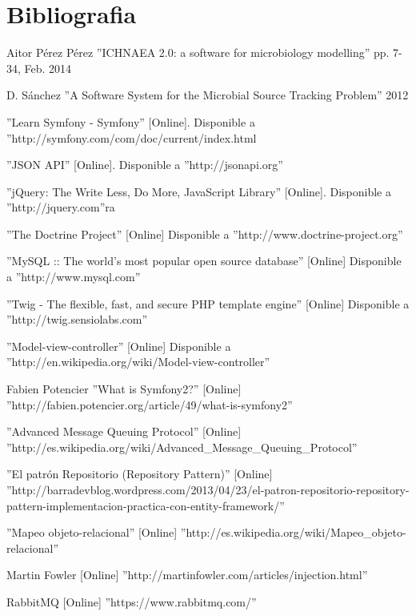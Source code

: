 \chapter{Bibliografia}
\label{cha:bibliografia}
\begin{thebibliography}{100}
Aitor P\'{e}rez P\'{e}rez ''ICHNAEA 2.0: a software for microbiology modelling'' pp. 7-34, Feb. 2014

D. S\'{a}nchez ''A Software System for the Microbial Source Tracking Problem'' 2012

 ''Learn Symfony - Symfony'' [Online]. Disponible a ''http://symfony.com/com/doc/current/index.html

 ''JSON API''  [Online]. Disponible a ''http://jsonapi.org''

 ''jQuery: The Write Less, Do More, JavaScript Library'' [Online]. Disponible a ''http://jquery.com''ra

 ''The Doctrine Project'' [Online] Disponible a ''http://www.doctrine-project.org''

 ''MySQL :: The world's most popular open source database'' [Online] Disponible a ''http://www.mysql.com''

 ''Twig - The flexible, fast, and secure PHP template engine''  [Online] Disponible a ''http://twig.sensiolabs.com''

 ''Model-view-controller'' [Online] Disponible a ''http://en.wikipedia.org/wiki/Model-view-controller''

 Fabien Potencier ''What is Symfony2?'' [Online] ''http://fabien.potencier.org/article/49/what-is-symfony2''

 ''Advanced Message Queuing Protocol'' [Online] ''http://es.wikipedia.org/wiki/Advanced\_Message\_Queuing\_Protocol''

 ''El patr\'{o}n Repositorio (Repository Pattern)'' [Online] ''http://barradevblog.wordpress.com/2013/04/23/el-patron-repositorio-repository-pattern-implementacion-practica-con-entity-framework/''

 ''Mapeo objeto-relacional'' [Online] ''http://es.wikipedia.org/wiki/Mapeo_objeto-relacional''

 Martin Fowler [Online] ''http://martinfowler.com/articles/injection.html''

 RabbitMQ [Online] ''https://www.rabbitmq.com/''


\end{thebibliography}
